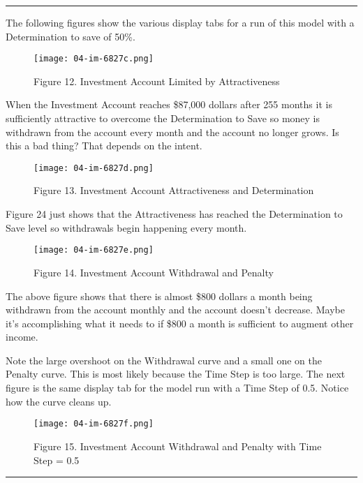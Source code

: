 \documentclass[]{memoir}
\let\Oldincludegraphics\includegraphics
\renewcommand{\includegraphics}[1]{\Oldincludegraphics[max size={\textwidth}{\textheight}]{#1}}
\begin{document}
\begin{center}\rule{3in}{0.4pt}\end{center}

The following figures show the various display tabs for a run of this
model with a Determination to save of 50\%.

\begin{figure}[htbp]
\centering
\texttt{[image: 04-im-6827c.png]}
\caption{Figure 12. Investment Account Limited by Attractiveness}
\end{figure}

When the Investment Account reaches \$87,000 dollars after 255 months it
is sufficiently attractive to overcome the Determination to Save so
money is withdrawn from the account every month and the account no
longer grows. Is this a bad thing? That depends on the intent.

\begin{figure}[htbp]
\centering
\texttt{[image: 04-im-6827d.png]}
\caption{Figure 13. Investment Account Attractiveness and Determination}
\end{figure}

Figure 24 just shows that the Attractiveness has reached the
Determination to Save level so withdrawals begin happening every month.

\begin{figure}[htbp]
\centering
\texttt{[image: 04-im-6827e.png]}
\caption{Figure 14. Investment Account Withdrawal and Penalty}
\end{figure}

The above figure shows that there is almost \$800 dollars a month being
withdrawn from the account monthly and the account doesn't decrease.
Maybe it's accomplishing what it needs to if \$800 a month is sufficient
to augment other income.

Note the large overshoot on the Withdrawal curve and a small one on the
Penalty curve. This is most likely because the Time Step is too large.
The next figure is the same display tab for the model run with a Time
Step of 0.5. Notice how the curve cleans up.

\begin{figure}[htbp]
\centering
\texttt{[image: 04-im-6827f.png]}
\caption{Figure 15. Investment Account Withdrawal and Penalty with Time
Step = 0.5}
\end{figure}

\begin{center}\rule{3in}{0.4pt}\end{center}
\end{document}
